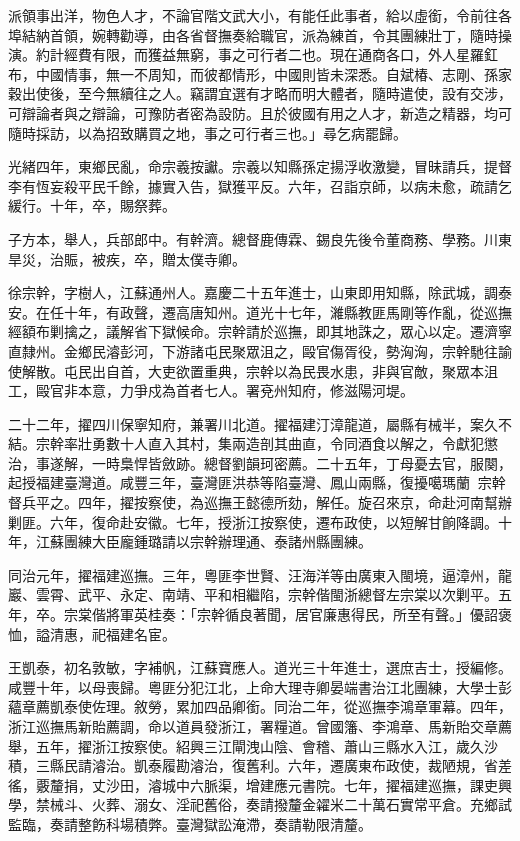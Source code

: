 \begin{pinyinscope}
派領事出洋，物色人才，不論官階文武大小，有能任此事者，給以虛銜，令前往各埠結納首領，婉轉勸導，由各省督撫奏給職官，派為練首，令其團練壯丁，隨時操演。約計經費有限，而獲益無窮，事之可行者二也。現在通商各口，外人星羅釭布，中國情事，無一不周知，而彼都情形，中國則皆未深悉。自斌椿、志剛、孫家穀出使後，至今無續往之人。竊謂宜選有才略而明大體者，隨時遣使，設有交涉，可辯論者與之辯論，可豫防者密為設防。且於彼國有用之人才，新造之精器，均可隨時採訪，以為招致購買之地，事之可行者三也。」尋乞病罷歸。

光緒四年，東鄉民亂，命宗羲按讞。宗羲以知縣孫定揚浮收激變，冒昧請兵，提督李有恆妄殺平民千餘，據實入告，獄獲平反。六年，召詣京師，以病未愈，疏請乞緩行。十年，卒，賜祭葬。

子方本，舉人，兵部郎中。有幹濟。總督鹿傳霖、錫良先後令董商務、學務。川東旱災，治賑，被疾，卒，贈太僕寺卿。

徐宗幹，字樹人，江蘇通州人。嘉慶二十五年進士，山東即用知縣，除武城，調泰安。在任十年，有政聲，遷高唐知州。道光十七年，濰縣教匪馬剛等作亂，從巡撫經額布剿擒之，議解省下獄候命。宗幹請於巡撫，即其地誅之，眾心以定。遷濟寧直隸州。金鄉民濬彭河，下游諸屯民聚眾沮之，毆官傷胥役，勢洶洶，宗幹馳往諭使解散。屯民出自首，大吏欲置重典，宗幹以為民畏水患，非與官敵，聚眾本沮工，毆官非本意，力爭戍為首者七人。署兗州知府，修滋陽河堤。

二十二年，擢四川保寧知府，兼署川北道。擢福建汀漳龍道，屬縣有械半，案久不結。宗幹率壯勇數十人直入其村，集兩造剖其曲直，令同酒食以解之，令獻犯懲治，事遂解，一時梟悍皆斂跡。總督劉韻珂密薦。二十五年，丁母憂去官，服闋，起授福建臺灣道。咸豐三年，臺灣匪洪恭等陷臺灣、鳳山兩縣，復擾噶瑪蘭，宗幹督兵平之。四年，擢按察使，為巡撫王懿德所劾，解任。旋召來京，命赴河南幫辦剿匪。六年，復命赴安徽。七年，授浙江按察使，遷布政使，以短解甘餉降調。十年，江蘇團練大臣龐鍾璐請以宗幹辦理通、泰諸州縣團練。

同治元年，擢福建巡撫。三年，粵匪李世賢、汪海洋等由廣東入閩境，逼漳州，龍巖、雲霄、武平、永定、南靖、平和相繼陷，宗幹偕閩浙總督左宗棠以次剿平。五年，卒。宗棠偕將軍英桂奏：「宗幹循良著聞，居官廉惠得民，所至有聲。」優詔褒恤，謚清惠，祀福建名宦。

王凱泰，初名敦敏，字補帆，江蘇寶應人。道光三十年進士，選庶吉士，授編修。咸豐十年，以母喪歸。粵匪分犯江北，上命大理寺卿晏端書治江北團練，大學士彭蘊章薦凱泰使佐理。敘勞，累加四品卿銜。同治二年，從巡撫李鴻章軍幕。四年，浙江巡撫馬新貽薦調，命以道員發浙江，署糧道。曾國籓、李鴻章、馬新貽交章薦舉，五年，擢浙江按察使。紹興三江閘洩山陰、會稽、蕭山三縣水入江，歲久沙積，三縣民請濬治。凱泰履勘濬治，復舊利。六年，遷廣東布政使，裁陋規，省差徭，覈釐捐，丈沙田，濬城中六脈渠，增建應元書院。七年，擢福建巡撫，課吏興學，禁械斗、火葬、溺女、淫祀舊俗，奏請撥釐金糴米二十萬石實常平倉。充鄉試監臨，奏請整飭科場積弊。臺灣獄訟淹滯，奏請勒限清釐。


\end{pinyinscope}
